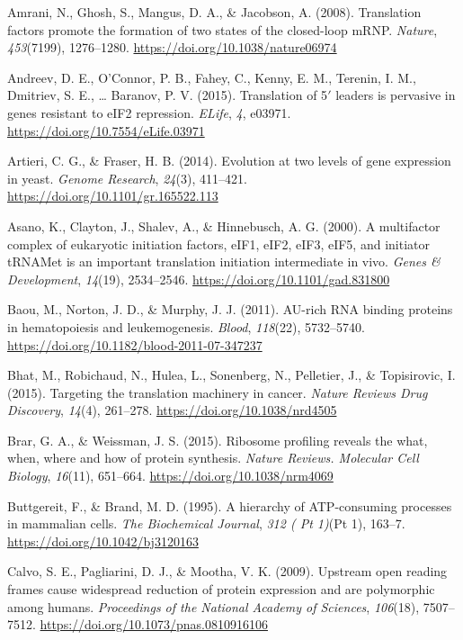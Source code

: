 \documentclass[12pt,openany]{book}
\begin{document}
\hypertarget{ref-Amrani2008}{}
Amrani, N., Ghosh, S., Mangus, D. A., \& Jacobson, A. (2008).
Translation factors promote the formation of two states of the
closed-loop mRNP. \emph{Nature}, \emph{453}(7199), 1276--1280.
\url{https://doi.org/10.1038/nature06974}

\hypertarget{ref-Andreev2015}{}
Andreev, D. E., O'Connor, P. B., Fahey, C., Kenny, E. M., Terenin, I.
M., Dmitriev, S. E., \ldots{} Baranov, P. V. (2015). Translation of
5\({'}\) leaders is pervasive in genes resistant to eIF2 repression.
\emph{ELife}, \emph{4}, e03971.
\url{https://doi.org/10.7554/eLife.03971}

\hypertarget{ref-Artieri2014}{}
Artieri, C. G., \& Fraser, H. B. (2014). Evolution at two levels of gene
expression in yeast. \emph{Genome Research}, \emph{24}(3), 411--421.
\url{https://doi.org/10.1101/gr.165522.113}

\hypertarget{ref-Asano2000}{}
Asano, K., Clayton, J., Shalev, A., \& Hinnebusch, A. G. (2000). A
multifactor complex of eukaryotic initiation factors, eIF1, eIF2, eIF3,
eIF5, and initiator tRNAMet is an important translation initiation
intermediate in vivo. \emph{Genes \& Development}, \emph{14}(19),
2534--2546. \url{https://doi.org/10.1101/gad.831800}

\hypertarget{ref-Baou2011}{}
Baou, M., Norton, J. D., \& Murphy, J. J. (2011). AU-rich RNA binding
proteins in hematopoiesis and leukemogenesis. \emph{Blood},
\emph{118}(22), 5732--5740.
\url{https://doi.org/10.1182/blood-2011-07-347237}

\hypertarget{ref-Bhat2015}{}
Bhat, M., Robichaud, N., Hulea, L., Sonenberg, N., Pelletier, J., \&
Topisirovic, I. (2015). Targeting the translation machinery in cancer.
\emph{Nature Reviews Drug Discovery}, \emph{14}(4), 261--278.
\url{https://doi.org/10.1038/nrd4505}

\hypertarget{ref-Brar2015}{}
Brar, G. A., \& Weissman, J. S. (2015). Ribosome profiling reveals the
what, when, where and how of protein synthesis. \emph{Nature Reviews.
Molecular Cell Biology}, \emph{16}(11), 651--664.
\url{https://doi.org/10.1038/nrm4069}

\hypertarget{ref-Buttgereit1995}{}
Buttgereit, F., \& Brand, M. D. (1995). A hierarchy of ATP-consuming
processes in mammalian cells. \emph{The Biochemical Journal}, \emph{312
( Pt 1)}(Pt 1), 163--7. \url{https://doi.org/10.1042/bj3120163}

\hypertarget{ref-Calvo2009}{}
Calvo, S. E., Pagliarini, D. J., \& Mootha, V. K. (2009). Upstream open
reading frames cause widespread reduction of protein expression and are
polymorphic among humans. \emph{Proceedings of the National Academy of
Sciences}, \emph{106}(18), 7507--7512.
\url{https://doi.org/10.1073/pnas.0810916106}
\end{document}
